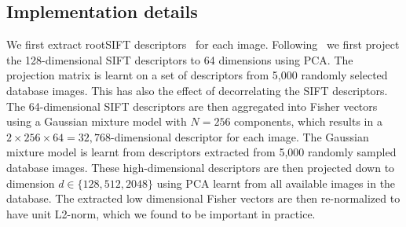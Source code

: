\documentclass[table]{article} %
\begin{document}
   \subsection{Implementation details}
      We first extract rootSIFT descriptors~\cite{Arandjelovic12} for each image. %
	Following~\cite{Jegou12} we first project the 128-dimensional SIFT descriptors to 64 dimensions using PCA. The projection matrix
	is learnt on a set of descriptors from 5,000 randomly selected database images. This has also the effect of decorrelating the SIFT descriptors. 
        The 64-dimensional SIFT descriptors are then aggregated into Fisher vectors using a Gaussian mixture model with $N=256$ components, which 
        results in a $2\times256\times64 = 32,768$-dimensional descriptor for each image.  
        The Gaussian mixture model is learnt from descriptors extracted from 5,000 randomly sampled database images. 
        These high-dimensional descriptors are then projected down to dimension $d\in\{128,512, 2048\}$ using PCA learnt
        from all available images in the database. 
        The extracted low dimensional Fisher vectors are then re-normalized to have unit L2-norm, which we found to be important in practice. 

\end{document}
